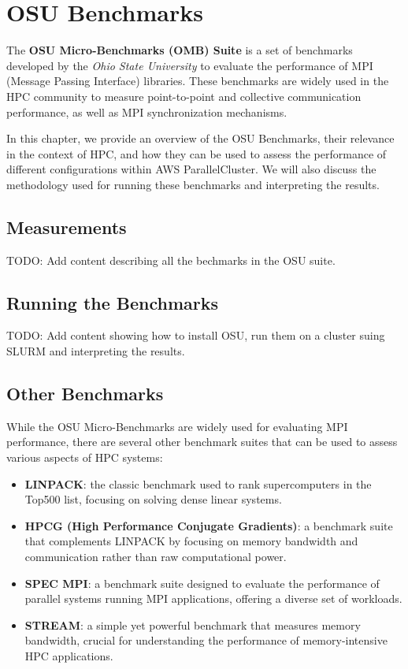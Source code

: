 \chapter{OSU Benchmarks}

The \textbf{OSU Micro-Benchmarks (OMB) Suite} is a set of benchmarks developed by the \textit{Ohio State
University} to evaluate the performance of MPI (Message Passing Interface) libraries.
These benchmarks are widely used in the HPC community to measure point-to-point and collective communication
performance, as well as MPI synchronization mechanisms.

In this chapter, we provide an overview of the OSU Benchmarks, their relevance in the context of HPC, and how
they can be used to assess the performance of different configurations within AWS ParallelCluster.
We will also discuss the methodology used for running these benchmarks and interpreting the results.

\section{Measurements}
\label{sec:measurements}

TODO: Add content describing all the bechmarks in the OSU suite.

\section{Running the Benchmarks}
\label{sec:running-the-benchmarks}

TODO: Add content showing how to install OSU, run them on a cluster suing SLURM and interpreting the results.

\section{Other Benchmarks}
\label{sec:other-benchmarks}
While the OSU Micro-Benchmarks are widely used for evaluating MPI performance, there are several other
benchmark suites that can be used to assess various aspects of HPC systems:

\begin{itemize}
  \item \textbf{LINPACK}: the classic benchmark used to rank supercomputers in the Top500 list, focusing on
    solving dense linear systems.
  \item \textbf{HPCG (High Performance Conjugate Gradients)}: a benchmark suite that complements LINPACK by
    focusing on memory bandwidth and communication rather than raw computational power.
  \item \textbf{SPEC MPI}: a benchmark suite designed to evaluate the performance of parallel systems running
    MPI applications, offering a diverse set of workloads.
  \item \textbf{STREAM}: a simple yet powerful benchmark that measures memory bandwidth, crucial for
    understanding the performance of memory-intensive HPC applications.
\end{itemize}
